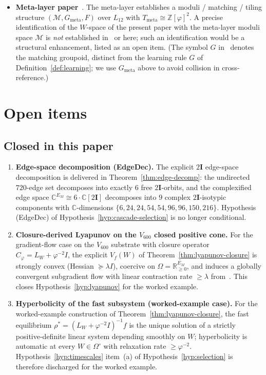 \documentclass[11pt]{article}
\theoremstyle{definition}
\newcommand{\R}{\mathbb{R}}
\newcommand{\C}{\mathbb{C}}
\newcommand{\Zphi}{\mathbb{Z}[\varphi]}
\newcommand{\twoI}{2\mathbf{I}}
\begin{document}
\begin{itemize}
    \item \textbf{Meta-layer paper}~\citep{CascadeMetaLayer}. The meta-layer establishes a moduli / matching / tiling structure $(\mathcal{M}, G_{\text{meta}}, F)$ over $L_{12}$ with $T_{\text{meta}} \cong \Zphi^2$. A precise identification of the $W$-space of the present paper with the meta-layer moduli space $\mathcal{M}$ is \emph{not} established in~\citep{CascadeMetaLayer} or here; such an identification would be a structural enhancement, listed as an open item. (The symbol $G$ in~\citep{CascadeMetaLayer} denotes the matching groupoid, distinct from the learning rule $G$ of Definition~\ref{def:learning}; we use $G_{\text{meta}}$ above to avoid collision in cross-reference.)
\end{itemize}

\section{Open items}\label{sec:open}

\subsection*{Closed in this paper}

\begin{enumerate}[label=\textbf{C\arabic*.}]
    \item \textbf{Edge-space decomposition (EdgeDec).} The explicit $\twoI$ edge-space decomposition is delivered in Theorem~\ref{thm:edge-decomp}: the undirected $720$-edge set decomposes into exactly $6$ free $\twoI$-orbits, and the complexified edge space $\C^{E_M} \cong 6\cdot\C[\twoI]$ decomposes into $9$ complex $\twoI$-isotypic components with $\C$-dimensions $\{6, 24, 24, 54, 54, 96, 96, 150, 216\}$. Hypothesis (EdgeDec) of Hypothesis~\ref{hyp:cascade-selection} is no longer conditional.
    \item \textbf{Closure-derived Lyapunov on the $V_{600}$ closed positive cone.} For the gradient-flow case on the $V_{600}$ substrate with closure operator $C_\varphi = L_W + \varphi^{-2} I$, the explicit $V_f(W)$ of Theorem~\ref{thm:lyapunov-closure} is strongly convex (Hessian $\succeq \lambda I$), coercive on $\Omega = \R^{E_M}_{\geq 0}$, and induces a globally convergent subgradient flow with linear contraction rate $\geq \lambda$ from~\citep{Brezis1973}. This closes Hypothesis~\ref{hyp:lyapunov} for the worked example.
    \item \textbf{Hyperbolicity of the fast subsystem (worked-example case).} For the worked-example construction of Theorem~\ref{thm:lyapunov-closure}, the fast equilibrium $\rho^* = (L_W + \varphi^{-2} I)^{-1} f$ is the unique solution of a strictly positive-definite linear system depending smoothly on $W$; hyperbolicity is automatic at every $W \in \Omega^\circ$ with relaxation rate $\geq \varphi^{-2}$. Hypothesis~\ref{hyp:timescales} item~(a) of Hypothesis~\ref{hyp:selection} is therefore discharged for the worked example.
\end{enumerate}
\end{document}
